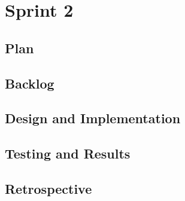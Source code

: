\section{Sprint 2}
\subsection{Plan}
\subsection{Backlog}
\subsection{Design and Implementation}
\subsection{Testing and Results}
\subsection{Retrospective}
